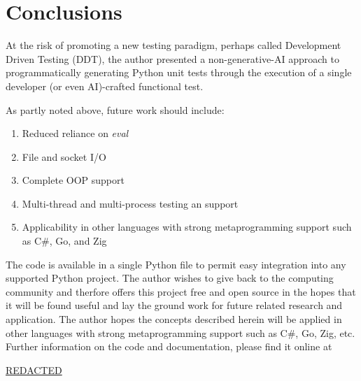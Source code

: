 \section{Conclusions}\label{sec:conclusions}

At the risk of promoting a new testing paradigm, perhaps 
called Development Driven Testing (DDT), the author 
presented a non-generative-AI approach to 
programmatically generating Python unit tests through
the execution of a single developer (or even AI)-crafted
functional test.

As partly noted above, future work should include: 
\begin{enumerate}
  \item Reduced reliance on \textit{eval}
  \item File and socket I/O
  \item Complete OOP support
  \item Multi-thread and multi-process testing an support
  \item Applicability in other languages with strong metaprogramming support such as C\#, Go, and Zig
\end{enumerate}

The code is available in a single Python file to permit 
easy integration into any supported Python project.
The author wishes to give back to the computing community
and therfore offers this project free and open source
in the hopes that it will be found useful and lay the ground
work for future related research and application.
The author hopes the concepts described herein will be 
applied in other languages with strong metaprogramming support
such as C\#, Go, Zig, etc.  Further information on the code and  documentation, please
find it online at
%
\begin{center}
  \url{REDACTED}
\end{center}


